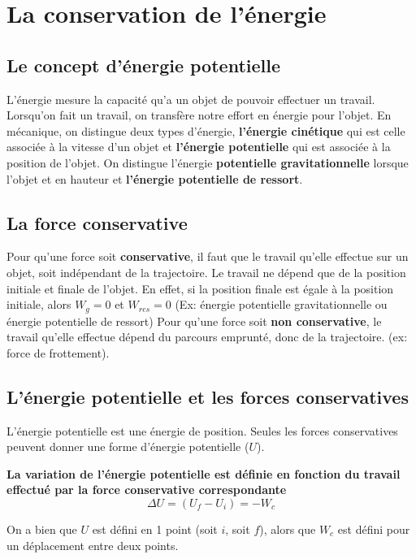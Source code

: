 \documentclass{article}
\begin{document}
\section{La conservation de l'énergie}
\subsection{Le concept d'énergie potentielle}
L'énergie mesure la capacité qu'a un objet de pouvoir effectuer un travail. 
\newline
Lorsqu'on fait un travail, on transfère notre effort en énergie pour l'objet. En mécanique, on distingue deux types d'énergie, \textbf{l'énergie cinétique} qui est celle associée à la vitesse d'un objet et \textbf{l'énergie potentielle} qui est associée à la position de l'objet. On distingue l'énergie \textbf{potentielle gravitationnelle} lorsque l'objet et en hauteur et \textbf{l'énergie potentielle de ressort}.

\subsection{La force conservative}
Pour qu'une force soit \textbf{conservative}, il faut que le travail qu'elle effectue sur un objet, soit indépendant de la trajectoire. Le travail ne dépend que de la position initiale et finale de l'objet. En effet, si la position finale est égale à la position initiale, alors $W_g = 0$ et $W_{res} = 0$ (Ex: énergie potentielle gravitationnelle ou énergie potentielle de ressort)
\newline
Pour qu'une force soit \textbf{non conservative}, le travail qu'elle effectue dépend du parcours emprunté, donc de la trajectoire. (ex: force de frottement).

\subsection{L'énergie potentielle et les forces conservatives}
L'énergie potentielle est une énergie de position. Seules les forces conservatives peuvent donner une forme d'énergie potentielle ($U$).
\newline

\noindent
\textbf{La variation de l'énergie potentielle est définie en fonction du travail effectué par la force conservative correspondante}
\[\Delta U = (U_f-U_i) = -W_c\]
\newline

On a bien que $U$ est défini en 1 point (soit $i$, soit $f$), alors que $W_c$ est défini pour un déplacement entre deux points.
\newline
\end{document}
